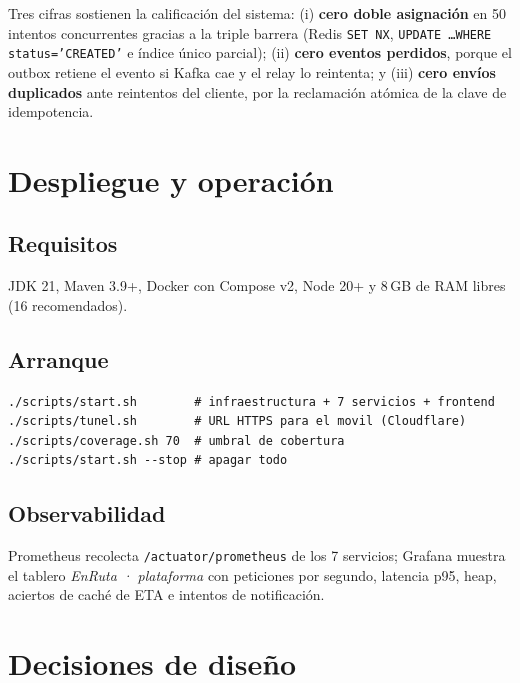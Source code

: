 \documentclass[conference]{IEEEtran}
\newcommand{\pkg}[1]{\texttt{#1}}
\begin{document}
Tres cifras sostienen la calificaci\'on del sistema: (i) \textbf{cero doble asignaci\'on} en 50
intentos concurrentes gracias a la triple barrera (Redis \pkg{SET NX}, \pkg{UPDATE \dots WHERE
status='CREATED'} e \'indice \'unico parcial); (ii) \textbf{cero eventos perdidos}, porque el
outbox retiene el evento si Kafka cae y el relay lo reintenta; y (iii) \textbf{cero env\'ios
duplicados} ante reintentos del cliente, por la reclamaci\'on at\'omica de la clave de
idempotencia.

\clearpage
\section{Despliegue y operación}

\subsection{Requisitos}

JDK 21, Maven 3.9+, Docker con Compose v2, Node 20+ y 8\,GB de RAM libres (16 recomendados).

\subsection{Arranque}

\begin{verbatim}
./scripts/start.sh        # infraestructura + 7 servicios + frontend
./scripts/tunel.sh        # URL HTTPS para el movil (Cloudflare)
./scripts/coverage.sh 70  # umbral de cobertura
./scripts/start.sh --stop # apagar todo
\end{verbatim}

\subsection{Observabilidad}

Prometheus recolecta \pkg{/actuator/prometheus} de los 7 servicios; Grafana muestra el tablero
\emph{EnRuta · plataforma} con peticiones por segundo, latencia p95, heap, aciertos de caché de
ETA e intentos de notificación.

\clearpage
\section{Decisiones de diseño}
\end{document}
